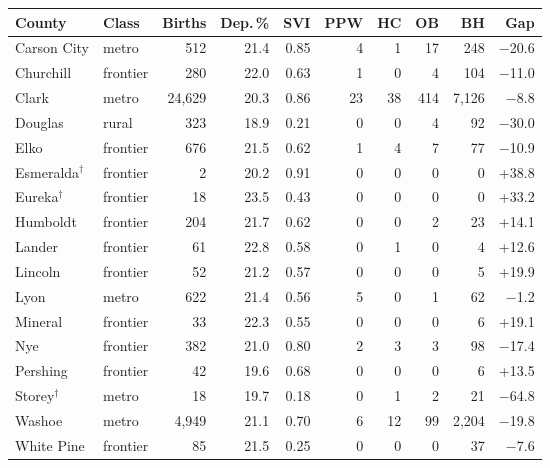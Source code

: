 \begin{tabular}{@{}llrrrrrrrr@{}}
\toprule
County & Class & Births & Dep.\,\% & SVI & PPW & HC & OB & BH & Gap \\
\midrule
Carson City & metro & 512 & 21.4 & 0.85 & 4 & 1 & 17 & 248 & $-$20.6 \\
Churchill & frontier & 280 & 22.0 & 0.63 & 1 & 0 & 4 & 104 & $-$11.0 \\
Clark & metro & 24,629 & 20.3 & 0.86 & 23 & 38 & 414 & 7,126 & $-$8.8 \\
Douglas & rural & 323 & 18.9 & 0.21 & 0 & 0 & 4 & 92 & $-$30.0 \\
Elko & frontier & 676 & 21.5 & 0.62 & 1 & 4 & 7 & 77 & $-$10.9 \\
Esmeralda$^\dagger$ & frontier & 2 & 20.2 & 0.91 & 0 & 0 & 0 & 0 & +38.8 \\
Eureka$^\dagger$ & frontier & 18 & 23.5 & 0.43 & 0 & 0 & 0 & 0 & +33.2 \\
Humboldt & frontier & 204 & 21.7 & 0.62 & 0 & 0 & 2 & 23 & +14.1 \\
Lander & frontier & 61 & 22.8 & 0.58 & 0 & 1 & 0 & 4 & +12.6 \\
Lincoln & frontier & 52 & 21.2 & 0.57 & 0 & 0 & 0 & 5 & +19.9 \\
Lyon & metro & 622 & 21.4 & 0.56 & 5 & 0 & 1 & 62 & $-$1.2 \\
Mineral & frontier & 33 & 22.3 & 0.55 & 0 & 0 & 0 & 6 & +19.1 \\
Nye & frontier & 382 & 21.0 & 0.80 & 2 & 3 & 3 & 98 & $-$17.4 \\
Pershing & frontier & 42 & 19.6 & 0.68 & 0 & 0 & 0 & 6 & +13.5 \\
Storey$^\dagger$ & metro & 18 & 19.7 & 0.18 & 0 & 1 & 2 & 21 & $-$64.8 \\
Washoe & metro & 4,949 & 21.1 & 0.70 & 6 & 12 & 99 & 2,204 & $-$19.8 \\
White Pine & frontier & 85 & 21.5 & 0.25 & 0 & 0 & 0 & 37 & $-$7.6 \\
\bottomrule
\end{tabular}